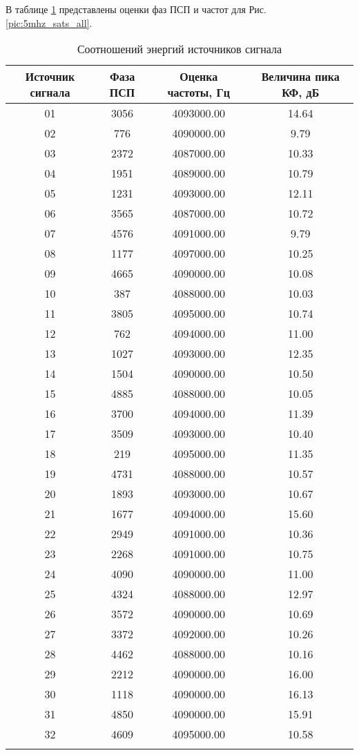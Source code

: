 В таблице \ref{tbl:5mhz_sats_all} представлены оценки фаз ПСП и частот для Рис. \ref{pic:5mhz_sats_all}.
\begin{center}
	\begin{longtable}{ | c | c | c | c |}
	\hline
	Источник сигнала & Фаза ПСП & Оценка частоты, Гц & Величина пика КФ, дБ \\ \hline
	01 & 3056 & 4093000.00 & 14.64 \\ \hline 
	02 & 776  & 4090000.00 & 9.79  \\ \hline
	03 & 2372 & 4087000.00 & 10.33 \\ \hline
	04 & 1951 & 4089000.00 & 10.79 \\ \hline
	05 & 1231 & 4093000.00 & 12.11 \\ \hline
	06 & 3565 & 4087000.00 & 10.72 \\ \hline
	07 & 4576 & 4091000.00 & 9.79  \\ \hline
	08 & 1177 & 4097000.00 & 10.25 \\ \hline
	09 & 4665 & 4090000.00 & 10.08 \\ \hline
	10 & 387  & 4088000.00 & 10.03 \\ \hline
	11 & 3805 & 4095000.00 & 10.74 \\ \hline
	12 & 762  & 4094000.00 & 11.00 \\ \hline
	13 & 1027 & 4093000.00 & 12.35 \\ \hline
	14 & 1504 & 4090000.00 & 10.50 \\ \hline
	15 & 4885 & 4088000.00 & 10.05 \\ \hline
	16 & 3700 & 4094000.00 & 11.39 \\ \hline
	17 & 3509 & 4093000.00 & 10.40 \\ \hline
	18 & 219  & 4095000.00 & 11.35 \\ \hline
	19 & 4731 & 4088000.00 & 10.57 \\ \hline
	20 & 1893 & 4093000.00 & 10.67 \\ \hline
	21 & 1677 & 4094000.00 & 15.60 \\ \hline
	22 & 2949 & 4091000.00 & 10.36 \\ \hline
	23 & 2268 & 4091000.00 & 10.75 \\ \hline
	24 & 4090 & 4090000.00 & 11.00 \\ \hline
	25 & 4324 & 4088000.00 & 12.97 \\ \hline
	26 & 3572 & 4090000.00 & 10.69 \\ \hline
	27 & 3372 & 4092000.00 & 10.26 \\ \hline
	28 & 4462 & 4088000.00 & 10.16 \\ \hline
	29 & 2212 & 4090000.00 & 16.00 \\ \hline
	30 & 1118 & 4090000.00 & 16.13 \\ \hline
	31 & 4850 & 4090000.00 & 15.91 \\ \hline
	32 & 4609 & 4095000.00 & 10.58 \\ \hline
	\caption{Соотношений энергий источников сигнала}
	\label{tbl:5mhz_sats_all}
	\end{longtable}
\end{center}

